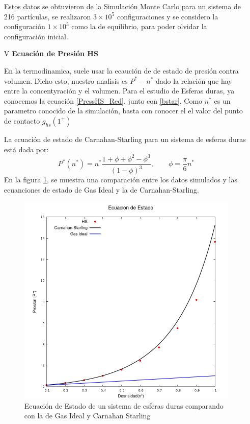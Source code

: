 \documentclass[12pt,letterpaper]{article}
\begin{document}
\begin{enumerate}
 Estos datos se obtuvieron de la Simulación Monte Carlo para un sistema de 216 partículas, se realizaron $3\times10^5$ configuraciones y se considero la configuración $1\times10^5$ como la de equilibrio, para poder olvidar la configuración inicial.

\item[V]\textbf{Ecuación de Presión HS}

En la termodinamica, suele usar la ecaución de de estado de presión contra volumen. Dicho esto, nuestro analisis es $P^*-n^*$ dado la relación que hay entre la concentyración y el volumen. Para el estudio de Esferas duras, ya conocemos la ecuación \eqref{PressHS_Red}, junto con \eqref{bstar}. Como $n^*$ es un parametro conocido de la simulación, basta con conocer el el valor del punto de contacto $g_{hs}(1^+)$

La ecuación de estado de Carnahan-Starling para un sistema de esferas duras está dada por:
\begin{equation}
P^*(n^*) = n^* \frac{1+\phi+\phi^2-\phi^3}{(1-\phi)^3}, \qquad \phi=\frac{\pi}{6} n^*
\end{equation}
En la figura \ref{Fig:EcEstado}, se muestra una comparación entre los datos simulados y las ecuanciones de estado de Gas Ideal y la de Carnahan-Starling.
\begin{figure}[H]
	\centering
	\includegraphics[width=0.75\linewidth]{Comparativo.png}
\caption{Ecuación de Estado de un sistema de esferas duras comparando con la de Gas Ideal y Carnahan Starling}
\label{Fig:EcEstado}
\end{figure}


\end{enumerate}
\end{document}
